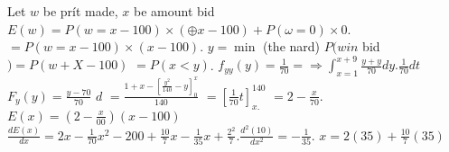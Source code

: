 Let $w$ be prít made, $x$ be amount bid
$E(w)=P(w=x-100) \times(\oplus x-100)+P(\omega=0) \times 0$.
$=P(w=x-100) \times(x-100)$.
$y=\min$ (the nard)
$P(w i n$ bid $)=P(w+X-100)$
$=P(x<y)$.
$f_{y y}(y)=\frac{1}{70}=\Rightarrow \int_{x=1}^{x+9} \frac{y+y}{70} d y . \frac{1}{70} d t$
$F_{y}(y)=\frac{y-70}{70}$
$d$
$=\frac{1+x-\left[\frac{y^{2}}{140}-y\right]_{0}^{x}}{140}$
$=\left[\frac{1}{70} t\right]_{x .}^{140}$
$=2-\frac{x}{70}$.
$E(x)=\left(2-\frac{x}{00}\right)(x-100)$
$\frac{d E(x)}{d x}=2 x-\frac{1}{70} x^{2}-200+\frac{10}{7} x-\frac{1}{35} x+\frac{2^{2}}{7} . \frac{d^{2}(10)}{d x^{2}}=-\frac{1}{35}$.
$x=2(35)+\frac{10}{7}(35)$